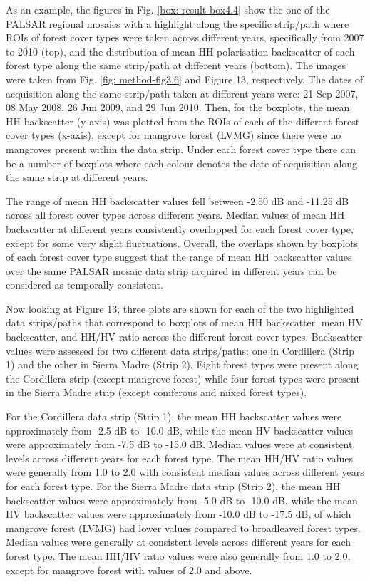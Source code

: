 As an example, the figures in Fig. \ref{box: result-box4.4} show the one of the PALSAR regional mosaics with a highlight along the specific strip/path where ROIs of forest cover types were taken across different years, specifically from 2007 to 2010 (top), and the distribution of mean HH polarisation backscatter of each forest type along the same strip/path at different years (bottom). The images were taken from Fig. \ref{fig: method-fig3.6} and Figure 13, respectively. The dates of acquisition along the same strip/path taken at different years were: 21 Sep 2007, 08 May 2008, 26 Jun 2009, and 29 Jun 2010. Then, for the boxplots, the mean HH backscatter (y-axis) was plotted from the ROIs of each of the different forest cover types (x-axis), except for mangrove forest (LVMG) since there were no mangroves present within the data strip. Under each forest cover type there can be a number of boxplots where each colour denotes the date of acquisition along the same strip at different years.

The range of mean HH backscatter values fell between -2.50 dB and -11.25 dB across all forest cover types across different years. Median values of mean HH backscatter at different years consistently overlapped for each forest cover type, except for some very slight fluctuations. Overall, the overlaps shown by boxplots of each forest cover type suggest that the range of mean HH backscatter values over the same PALSAR mosaic data strip acquired in different years can be considered as temporally consistent.

Now looking at Figure 13, three plots are shown for each of the two highlighted data strips/paths that correspond to boxplots of mean HH backscatter, mean HV backscatter, and HH/HV ratio across the different forest cover types. Backscatter values were assessed for two different data strips/paths: one in Cordillera (Strip 1) and the other in Sierra Madre (Strip 2). Eight forest types were present along the Cordillera strip (except mangrove forest) while four forest types were present in the Sierra Madre strip (except coniferous and mixed forest types).

For the Cordillera data strip (Strip 1), the mean HH backscatter values were approximately from -2.5 dB to -10.0 dB, while the mean HV backscatter values were approximately from -7.5 dB to -15.0 dB. Median values were at consistent levels across different years for each forest type. The mean HH/HV ratio values were generally from 1.0 to 2.0 with consistent median values across different years for each forest type. For the Sierra Madre data strip (Strip 2), the mean HH backscatter values were approximately from -5.0 dB to -10.0 dB, while the mean HV backscatter values were approximately from -10.0 dB to -17.5 dB, of which mangrove forest (LVMG) had lower values compared to broadleaved forest types. Median values were generally at consistent levels across different years for each forest type. The mean HH/HV ratio values were also generally from 1.0 to 2.0, except for mangrove forest with values of 2.0 and above.


